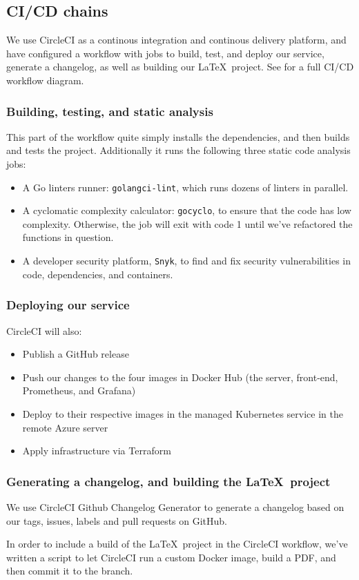 \subsection{CI/CD chains}

We use CircleCI as a continous integration and continous delivery platform, and have configured a workflow \cite{workflow:circleci} with jobs to build, test, and deploy our service, generate a changelog, as well as building our \LaTeX\ project. See  for a full CI/CD workflow diagram.


\subsubsection{Building, testing, and static analysis}

This part of the workflow quite simply installs the dependencies, and then builds and tests the project. Additionally it runs the following three static code analysis jobs:
\begin{itemize}
    \item A Go linters runner: \texttt{golangci-lint}, which runs dozens of linters in parallel.
    \item A cyclomatic complexity calculator: \texttt{gocyclo}, to ensure that the code has low complexity. Otherwise, the job will exit with code 1 until we've refactored the functions in question.
    \item A developer security platform, \texttt{Snyk}, to find and fix security vulnerabilities in code, dependencies, and containers.
\end{itemize}


\subsubsection{Deploying our service}

CircleCI will also:
\begin{itemize}
    \item Publish a GitHub release
    \item Push our changes to the four images in Docker Hub (the server, front-end, Prometheus, and Grafana)
    \item Deploy to their respective images in the managed Kubernetes service in the remote Azure server
    \item Apply infrastructure via Terraform
\end{itemize}


\subsubsection{Generating a changelog, and building the \LaTeX\ project}

We use CircleCI Github Changelog Generator \cite{repo:changelog-generator} to generate a changelog based on our tags, issues, labels and pull requests on GitHub.

In order to include a build of the \LaTeX\ project in the CircleCI workflow, we've written a script to let CircleCI run a custom Docker image, build a PDF, and then commit it to the branch.
